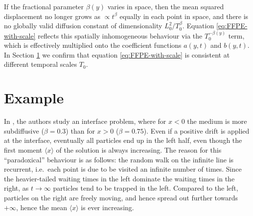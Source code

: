 \documentclass[a4paper,12pt]{article}
\numberwithin{equation}{section}
\theoremstyle{plain}
\theoremstyle{definition}
\theoremstyle{remark}
\numberwithin{equation}{section}
\newcommand{\1}{\mathbf 1}
\begin{document}
If the fractional parameter $\beta(y)$ varies in space, then the mean squared displacement no longer grows as $\propto t^\beta$ equally in each point in space, and 
there is no globally valid diffusion constant of dimensionality $L_0^2 / T_0^\beta$.  
Equation
\eqref{eq:FFPE-with-scale} reflects this spatially inhomogeneous behaviour
via the $T_0^{-\beta(y)}$ term, which is effectively multiplied onto the
coefficient functions $a(y,t)$ and $b(y,t)$.  In Section \ref{sec:examples}
we confirm that equation \eqref{eq:FFPE-with-scale} is consistent at 
different temporal scales $T_0$. 


\section{Example}
\label{sec:examples}

In \cite{Korabel2010}, the authors study an interface problem, where for $x<0$ the medium is more subdiffusive ($\beta = 0.3$) than for $x>0$ ($\beta = 0.75$).  Even if a positive drift is applied at the interface, eventually all particles end up in the left half, even though the first moment $\langle x \rangle$ of the solution is always increasing. The reason for this ``paradoxical'' behaviour is as follows: the random walk on the infinite line is recurrent, i.e.\ each point is due to be visited an infinite number of times. Since the heavier-tailed waiting times in the left dominate the waiting times in the right, as $t \to \infty$ particles tend to be trapped in the left. Compared to the left, particles on the right are freely moving, and hence spread out further towards $+\infty$, hence the mean $\langle x \rangle$ is ever increasing. 
\end{document}

